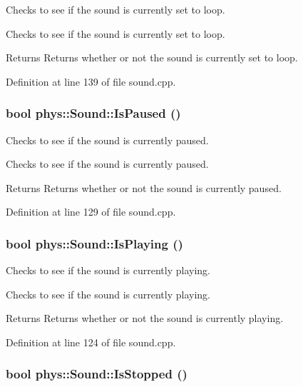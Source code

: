 Checks to see if the sound is currently set to loop. 

Checks to see if the sound is currently set to loop. \begin{DoxyReturn}{Returns}
Returns whether or not the sound is currently set to loop. 
\end{DoxyReturn}


Definition at line 139 of file sound.cpp.

\hypertarget{classphys_1_1Sound_a21ad445ca3e3b4836ee838c41584d8c1}{
\subsubsection[{IsPaused}]{\setlength{\rightskip}{0pt plus 5cm}bool phys::Sound::IsPaused ()}}
\label{dc/d2f/classphys_1_1Sound_a21ad445ca3e3b4836ee838c41584d8c1}


Checks to see if the sound is currently paused. 

Checks to see if the sound is currently paused. \begin{DoxyReturn}{Returns}
Returns whether or not the sound is currently paused. 
\end{DoxyReturn}


Definition at line 129 of file sound.cpp.

\hypertarget{classphys_1_1Sound_a382b26fd5289da4fdb2b536e953b7ea0}{
\subsubsection[{IsPlaying}]{\setlength{\rightskip}{0pt plus 5cm}bool phys::Sound::IsPlaying ()}}
\label{dc/d2f/classphys_1_1Sound_a382b26fd5289da4fdb2b536e953b7ea0}


Checks to see if the sound is currently playing. 

Checks to see if the sound is currently playing. \begin{DoxyReturn}{Returns}
Returns whether or not the sound is currently playing. 
\end{DoxyReturn}


Definition at line 124 of file sound.cpp.

\hypertarget{classphys_1_1Sound_ac35ba604ca2aaab246e5ce5f524d10f9}{
\subsubsection[{IsStopped}]{\setlength{\rightskip}{0pt plus 5cm}bool phys::Sound::IsStopped ()}}
\label{dc/d2f/classphys_1_1Sound_ac35ba604ca2aaab246e5ce5f524d10f9}


